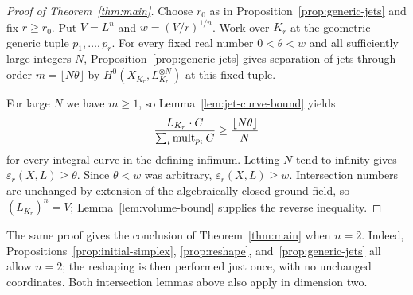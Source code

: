 \begin{proof}[Proof of Theorem~\ref{thm:main}]
Choose $r_0$ as in Proposition~\ref{prop:generic-jets} and fix $r\geq r_0$.
Put $V=L^n$ and $w=(V/r)^{1/n}$.  Work over $K_r$ at the geometric generic tuple
$p_1,\ldots,p_r$.  For every fixed real number $0<\theta<w$ and all
sufficiently large integers $N$, Proposition~\ref{prop:generic-jets} gives
separation of jets through order $m=\lfloor N\theta\rfloor$ by
$H^0(X_{K_r},L_{K_r}^{\otimes N})$ at this fixed tuple.

For large $N$ we have $m\geq1$, so Lemma~\ref{lem:jet-curve-bound} yields
\[
 \frac{L_{K_r}\cdot C}{\sum_i\operatorname{mult}_{p_i}C}
 \geq\frac{\lfloor N\theta\rfloor}{N}
\]
for every integral curve in the defining infimum.  Letting $N$ tend to
infinity gives $\varepsilon_r(X,L)\geq\theta$.  Since $\theta<w$ was
arbitrary, $\varepsilon_r(X,L)\geq w$.  Intersection numbers are unchanged
by extension of the algebraically closed ground field, so
$(L_{K_r})^n=V$; Lemma~\ref{lem:volume-bound} supplies the reverse inequality.
\end{proof}

\begin{remark}[Surfaces]\label{rem:surfaces}
The same proof gives the conclusion of Theorem~\ref{thm:main} when $n=2$.
Indeed, Propositions~\ref{prop:initial-simplex}, \ref{prop:reshape},
and~\ref{prop:generic-jets} all allow $n=2$; the reshaping is then performed
just once, with no unchanged coordinates.  Both intersection lemmas above
also apply in dimension two.
\end{remark}
